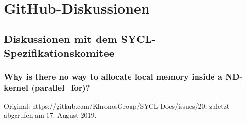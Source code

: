 \chapter{GitHub-Diskussionen}\label{anhang:github}

\section{Diskussionen mit dem SYCL-Spezifikationskomitee}
\label{anhang:github:syclspec}

\subsection{Why is there no way to allocate local memory inside a ND-kernel
            (parallel\_for)?}\label{anhang:github:syclspec:staticshared}

Original: \url{https://github.com/KhronosGroup/SYCL-Docs/issues/20}, zuletzt
abgerufen am 07. August 2019.

